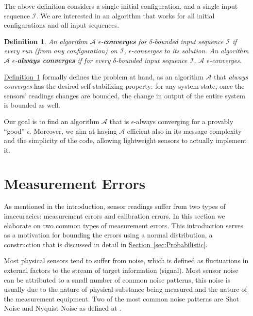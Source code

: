 \documentclass[preprint,12pt]{elsarticle}
\newtheorem{definition}{Definition}
\newcommand{\namedref}[2]{\hyperref[#2]{#1~\ref*{#2}}}
\newcommand{\sectionref}[1]{\namedref{Section}{#1}}
\newcommand{\definitionref}[1]{\namedref{Definition}{#1}}
\newcommand\A{\mathcal{A}}
\begin{document}
The above definition considers a single initial configuration, and
a single input sequence $\mathcal{I}$. We are interested in an
algorithm that works for all initial configurations and all input
sequences.

\begin{definition}\label{def:alwaysconv}
  An algorithm $\A$ $\epsilon$-{\bf converges} for $\delta$-bounded input sequence $\mathcal{I}$ if every run (from any configuration) on
  $\mathcal{I}$,
  $\epsilon$-converges to its solution.  An algorithm $\A$ $\epsilon$-{\bf always converges} if for
  every $\delta$-bounded input sequence $\mathcal{I}$, $\A$ $\epsilon$-converges.
\end{definition}

\definitionref{def:alwaysconv} formally defines the problem at
hand, as an algorithm $\A$ that {\em always converges} has the
desired self-stabilizing property: for any system state, once the
sensors' readings changes are bounded, the change in output of the
entire system is bounded as well.

Our goal is to find an algorithm $\A$ that is $\epsilon$-always
converging for a provably ``good'' $\epsilon$. Moreover, we aim at
having $\A$ efficient also in its message complexity and
the simplicity of the code, allowing lightweight sensors to actually
implement it.

\section{Measurement Errors}\label{sec:Errors}
As mentioned in the introduction, sensor readings suffer from two types of inaccuracies: measurement errors
and calibration errors. In this section we elaborate on two common types of measurement errors.
This introduction serves as a motivation for bounding the errors using a normal distribution,
a construction that is discussed in detail in \sectionref{sec:Probabilistic}.

Most physical sensors tend to suffer from noise, which is defined as fluctuations in external factors to the stream of target information (signal). Most sensor noise can be attributed to a small number of common noise patterns, this noise is usually due to the nature of physical substance being measured and the nature of the measurement equipment. Two of the most common noise patterns are Shot Noise and Nyquist Noise as defined at \cite{RFCD97}.
\end{document}
